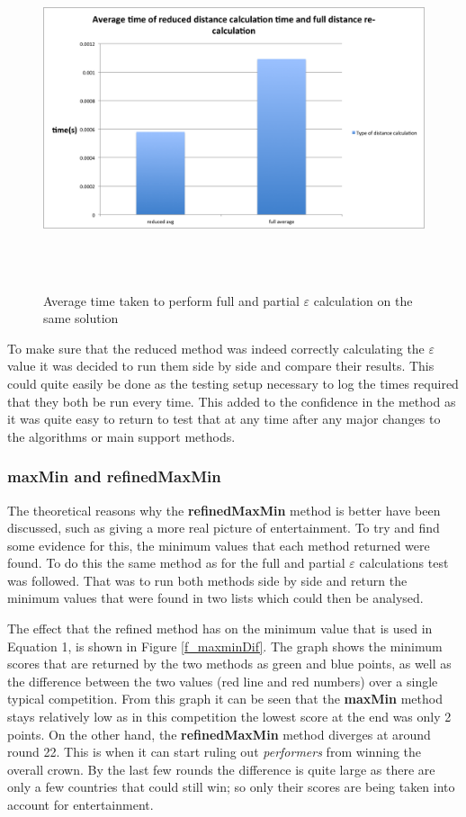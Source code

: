 \documentclass[12pt]{report}
\begin{document}
\begin{figure}[H]
\centering
\includegraphics[width=18cm, height=10cm]{../code/misc/reducedvsFullDistanceCalc}
\caption{Average time taken to perform full and partial $\varepsilon$ calculation on the same solution}
\label{f_recalcComparison}
\end{figure}

To make sure that the reduced method was indeed correctly calculating the $\varepsilon$ value it was decided to run them side by side and compare their results. This could quite easily be done as the testing setup necessary to log the times required that they both be run every time. This added to the confidence in the method as it was quite easy to return to test that at any time after any major changes to the algorithms or main support methods.

\subsubsection{maxMin and refinedMaxMin}
The theoretical reasons why the \textbf{refinedMaxMin} method is better have been discussed, such as giving a more real picture of entertainment. To try and find some evidence for this, the  minimum values that each method returned were found. To do this the same method as for the full and partial $\varepsilon$ calculations test was followed. That was to run both methods side by side and return the minimum values that were found in two lists which could then be analysed.

The effect that the refined method has on the minimum value that is used in Equation 1, is shown in Figure \ref{f_maxminDif}. The graph shows the minimum scores that are returned by the two methods as green and blue points, as well as the difference between the two values (red line and red numbers) over a single typical competition. From this graph it can be seen that the \textbf{maxMin} method stays relatively low as in this competition the lowest score at the end was only 2 points. On the other hand, the \textbf{refinedMaxMin} method diverges at around round 22. This is when it can start ruling out \textit{performers} from winning the overall crown. By the last few rounds the difference is quite large as there are only a few countries that could still win; so only their scores are being taken into account for entertainment.
\end{document}

